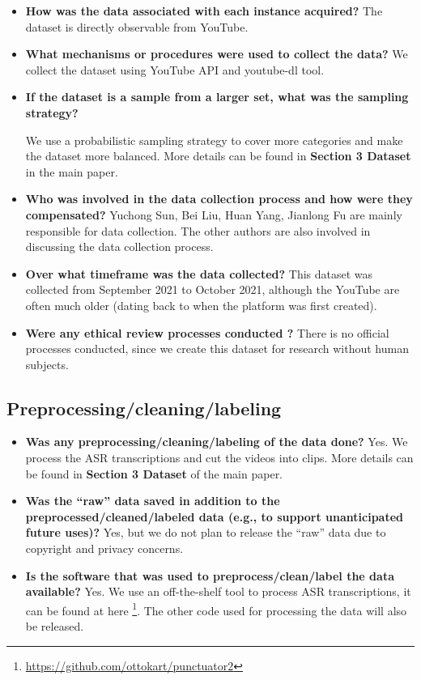 \begin{itemize}

\item \textbf{How was the data associated with each instance
acquired?} 
The dataset is directly observable from YouTube.

\item \textbf{What mechanisms or procedures were used to collect the data?} 
We collect the dataset using YouTube API and youtube-dl tool.

\item \textbf{If the dataset is a sample from a larger set, what was the sampling strategy?}

We use a probabilistic sampling strategy to cover more categories and make the dataset more balanced. More details can be found in \textbf{Section 3 Dataset} in the main paper.

\item \textbf{Who was involved in the data collection process and how were they compensated?}
Yuchong Sun, Bei Liu, Huan Yang, Jianlong Fu are mainly responsible for data collection. The other authors are also involved in discussing the data collection process.

\item \textbf{Over what timeframe was the data collected?}
This dataset was collected from September 2021 to October 2021, although the YouTube are often much older (dating back
to when the platform was first created).

\item \textbf{Were any ethical review processes conducted ?} 
There is no official processes conducted, since we create this dataset for research without human subjects. 

\end{itemize}

\subsection{Preprocessing/cleaning/labeling}

\begin{itemize}

\item \textbf{Was any preprocessing/cleaning/labeling of the data done?}
Yes. We process the ASR transcriptions and cut the videos into clips. More details can be found in \textbf{Section 3 Dataset} of the main paper.

\item \textbf{Was the ``raw'' data saved in addition to the preprocessed/cleaned/labeled data (e.g., to support unanticipated future uses)?}
Yes, but we do not plan to release the ``raw'' data due to copyright and privacy concerns.

\item \textbf{Is the software that was used to preprocess/clean/label the data available?}
Yes. We use an off-the-shelf tool to process ASR transcriptions, it can be found at here \footnote{\url{https://github.com/ottokart/punctuator2}}. The other code used for processing the data will also be released.

\end{itemize}

